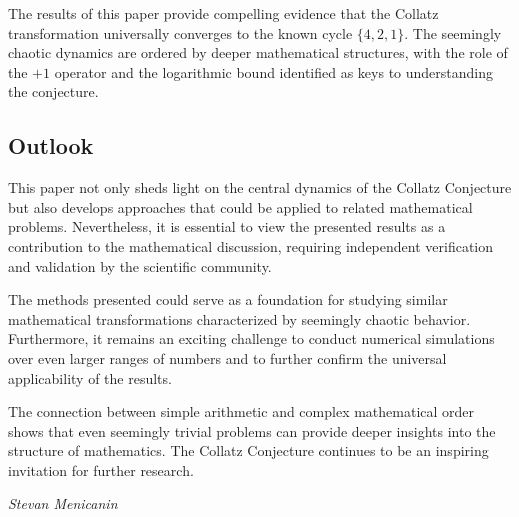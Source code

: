 \documentclass[a4paper,12pt]{article}
\begin{document}
The results of this paper provide compelling evidence that the Collatz transformation universally converges to the known cycle \( \{4, 2, 1\} \). The seemingly chaotic dynamics are ordered by deeper mathematical structures, with the role of the \(+1\) operator and the logarithmic bound identified as keys to understanding the conjecture.

\subsection*{Outlook}
This paper not only sheds light on the central dynamics of the Collatz Conjecture but also develops approaches that could be applied to related mathematical problems. Nevertheless, it is essential to view the presented results as a contribution to the mathematical discussion, requiring independent verification and validation by the scientific community.

The methods presented could serve as a foundation for studying similar mathematical transformations characterized by seemingly chaotic behavior. Furthermore, it remains an exciting challenge to conduct numerical simulations over even larger ranges of numbers and to further confirm the universal applicability of the results.

The connection between simple arithmetic and complex mathematical order shows that even seemingly trivial problems can provide deeper insights into the structure of mathematics. The Collatz Conjecture continues to be an inspiring invitation for further research.

\vspace{1cm}
\begin{flushright}
\textit{Stevan Menicanin}
\end{flushright}
\end{document}
